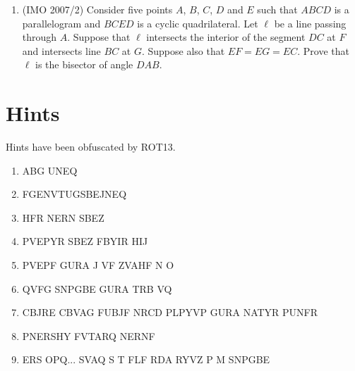 \begin{enumerate}
  \item (IMO 2007/2) Consider five points $A$, $B$, $C$, $D$ and $E$ such that $ABCD$ is a parallelogram and $BCED$ is a cyclic quadrilateral. Let $\ell$ be a line passing through $A$. Suppose that $\ell$ intersects the interior of the segment $DC$ at $F$ and intersects line $BC$ at $G$. Suppose also that $EF = EG = EC$. Prove that $\ell$ is the bisector of angle $DAB$. 
\end{enumerate}


\section{Hints}
Hints have been obfuscated by ROT13.
\begin{enumerate}
  \item ABG UNEQ
  \item FGENVTUGSBEJNEQ
  \item HFR NERN SBEZ
  \item PVEPYR SBEZ FBYIR HIJ
  \item PVEPF GURA J VF ZVAHF N O
  \item QVFG SNPGBE GURA TRB VQ
  \item CBJRE CBVAG FUBJF NRCD PLPYVP GURA NATYR PUNFR
  \item PNERSHY FVTARQ NERNF
  \item ERS OPQ... SVAQ S T FLF RDA RYVZ P M SNPGBE
\end{enumerate}
